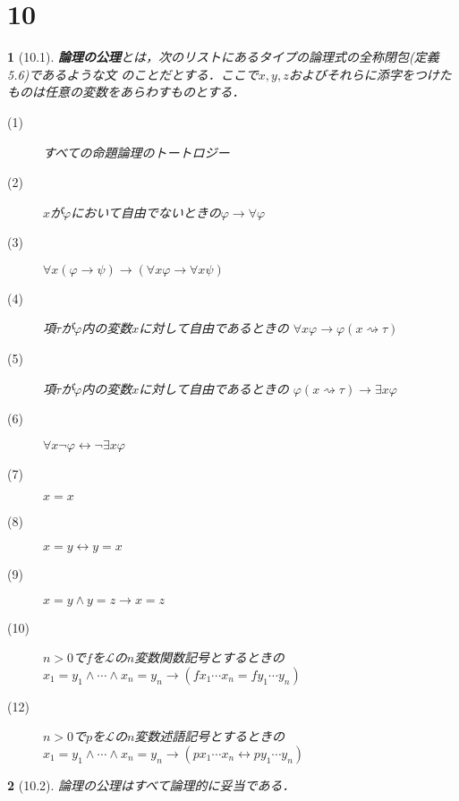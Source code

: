 \documentclass[a4j,10.5pt,oneside,openany]{jsbook}
\theoremstyle{mystyle}
\newtheorem{thm}{\color{DarkMidnightBlue}{定理}}[section]
\newtheorem{dfn}[thm]{\color{PakistanGreen}{定義}}
\begin{document}
\section{10}
	\begin{screen}
		\begin{dfn}[10.1]
			{\bf 論理の公理}とは，次のリストにあるタイプの論理式の全称閉包(定義5.6)であるような文
			のことだとする．ここで$x,y,z$およびそれらに添字をつけたものは任意の変数をあらわすものとする．
			\begin{description}
				\item[(1)] すべての命題論理のトートロジー
				\item[(2)] $x$が$\varphi$において自由でないときの$\varphi \rightarrow \forall \varphi$
				\item[(3)] $\forall x(\varphi \rightarrow \psi) \rightarrow
					(\forall x \varphi \rightarrow \forall x \psi)$
				\item[(4)] 項$\tau$が$\varphi$内の変数$x$に対して自由であるときの
					$\forall x \varphi \rightarrow \varphi(x \rightsquigarrow \tau)$
				\item[(5)] 項$\tau$が$\varphi$内の変数$x$に対して自由であるときの
					$\varphi(x \rightsquigarrow \tau) \rightarrow \exists x \varphi$
				\item[(6)] $\forall x \neg \varphi \leftrightarrow \neg \exists x \varphi$
				\item[(7)] $x = x$
				\item[(8)] $x = y \leftrightarrow y = x$
				\item[(9)] $x = y \wedge y = z \rightarrow x = z$
				\item[(10)] $n > 0$で$f$を$\mathcal{L}$の$n$変数関数記号とするときの
					$x_{1} = y_{1} \wedge \cdots \wedge x_{n} = y_{n} \rightarrow
					\left(fx_{1} \cdots x_{n} = fy_{1} \cdots y_{n}\right)$
				\item[(12)] $n > 0$で$p$を$\mathcal{L}$の$n$変数述語記号とするときの
					$x_{1} = y_{1} \wedge \cdots \wedge x_{n} = y_{n} \rightarrow
					\left(p x_{1} \cdots x_{n} \leftrightarrow p y_{1} \cdots y_{n}\right)$
			\end{description}
		\end{dfn}
	\end{screen}
	
	\begin{screen}
		\begin{thm}[10.2]
			論理の公理はすべて論理的に妥当である．
		\end{thm}
	\end{screen}
	
\end{document}
